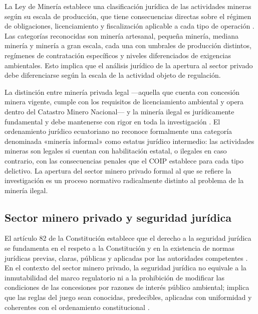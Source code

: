 La Ley de Minería establece una clasificación jurídica de las actividades mineras según su escala de producción, que tiene consecuencias directas sobre el régimen de obligaciones, licenciamiento y fiscalización aplicable a cada tipo de operación \parencite{ley_mineria_2025}. Las categorías reconocidas son minería artesanal, pequeña minería, mediana minería y minería a gran escala, cada una con umbrales de producción distintos, regímenes de contratación específicos y niveles diferenciados de exigencias ambientales. Esto implica que el análisis jurídico de la apertura al sector privado debe diferenciarse según la escala de la actividad objeto de regulación.

La distinción entre minería privada legal ---aquella que cuenta con concesión minera vigente, cumple con los requisitos de licenciamiento ambiental y opera dentro del Catastro Minero Nacional--- y la minería ilegal es jurídicamente fundamental y debe mantenerse con rigor en toda la investigación \parencite{coip_2014,ley_mineria_2025}. El ordenamiento jurídico ecuatoriano no reconoce formalmente una categoría denominada «minería informal» como estatus jurídico intermedio: las actividades mineras son legales si cuentan con habilitación estatal, o ilegales en caso contrario, con las consecuencias penales que el COIP establece para cada tipo delictivo. La apertura del sector minero privado formal al que se refiere la investigación es un proceso normativo radicalmente distinto al problema de la minería ilegal.

\subsection{Sector minero privado y seguridad jurídica}

El artículo 82 de la Constitución establece que el derecho a la seguridad jurídica se fundamenta en el respeto a la Constitución y en la existencia de normas jurídicas previas, claras, públicas y aplicadas por las autoridades competentes \parencite{cre_2008}. En el contexto del sector minero privado, la seguridad jurídica no equivale a la inmutabilidad del marco regulatorio ni a la prohibición de modificar las condiciones de las concesiones por razones de interés público ambiental; implica que las reglas del juego sean conocidas, predecibles, aplicadas con uniformidad y coherentes con el ordenamiento constitucional \parencite{villacis_calvas_2022}.


